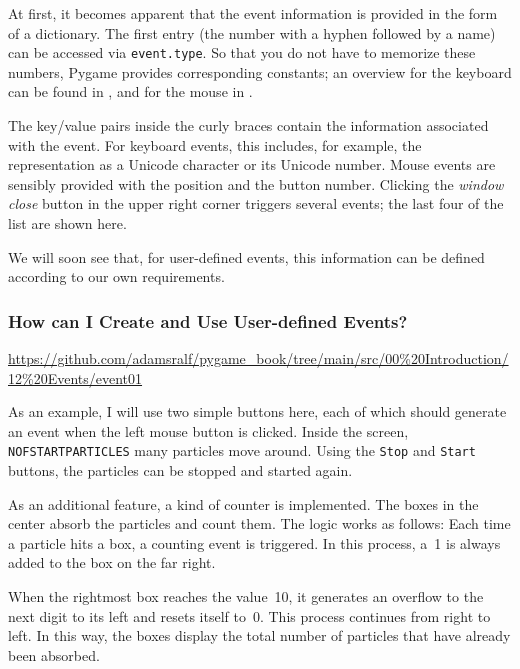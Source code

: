 At first, it becomes apparent that the event information is provided in the form of a dictionary. The first entry (the number with a hyphen followed by a name) can be accessed via \texttt{event.type}. So that you do not have to memorize these numbers, Pygame provides corresponding constants; an overview for the keyboard can be found in , and for the mouse in .

The key/value pairs inside the curly braces contain the information associated with the event.  For keyboard events, this includes, for example, the representation as a Unicode character or its Unicode number. Mouse events are sensibly provided with the position and the button number. Clicking the \emph{window close} button in the upper right corner triggers several events; the last four of the list are shown here.

We will soon see that, for user-defined events, this information can be defined according to our own requirements.


\subsubsection{How can I Create and Use User-defined Events?}
\begin{diskbox}
	\url{https://github.com/adamsralf/pygame_book/tree/main/src/00%20Introduction/12%20Events/event01}
\end{diskbox}
As an example, I will use two simple buttons here, each of which should generate an event when the left mouse button is clicked. Inside the screen, \texttt{NOFSTARTPARTICLES} many particles move around. Using the \texttt{Stop} and \texttt{Start} buttons, the particles can be stopped and started again.


As an additional feature, a kind of counter is implemented. The boxes in the center absorb the particles and count them. The logic works as follows: Each time a particle hits a box, a counting event is triggered. In this process, a~1 is always added to the box on the far right.

When the rightmost box reaches the value~10, it generates an overflow to the next digit to its left and resets itself to~0. This process continues from right to left. In this way, the boxes display the total number of particles that have already been absorbed.


